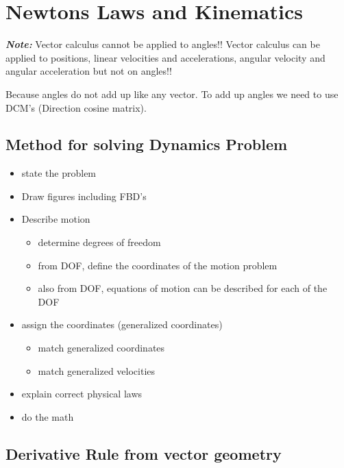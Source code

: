 \chapter{Newtons Laws and Kinematics}

\textbf{\textit{Note: }}Vector calculus cannot be applied to angles!!
Vector calculus can be applied to positions, linear velocities and accelerations, angular velocity and angular acceleration but not on angles!!

Because angles do not add up like any vector. To add up angles we need to use DCM's (Direction cosine matrix).

\section{Method for solving Dynamics Problem}

\begin{itemize}
	\item state the problem
	\item Draw figures including FBD's
	\item Describe motion
	\begin{itemize}
		\item determine degrees of freedom
		\item from DOF, define the coordinates of the motion problem
		\item also from DOF, equations of motion can be described for each of the DOF
	\end{itemize}
	\item assign the coordinates (generalized coordinates)
	\begin{itemize}
		\item match generalized coordinates
		\item match generalized velocities
	\end{itemize}
	\item explain correct physical laws
	\item do the math
\end{itemize}

\section{Derivative Rule from vector geometry}

